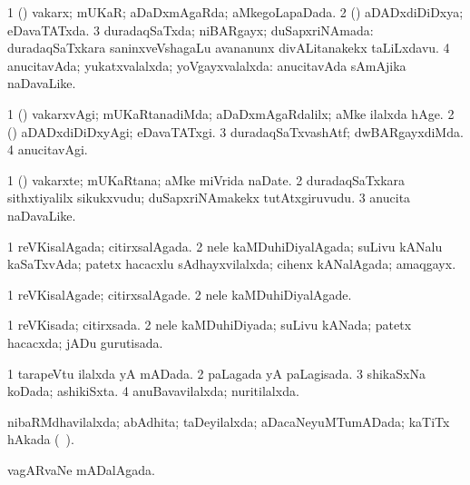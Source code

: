 \bentry
{} 
\gl{\gu}
\expl{}
\bmng
\bnum
\num{1} (\pArxparx) vakarx; mUKaR; aDaDxmAgaRda; aMkegoLapaDada. 
\num{2} (\gaparx) aDADxdiDiDxya; eDavaTATxda. 
\num{3} duradaqSaTxda; niBARgayx; duSapxriNAmada:  duradaqSaTxkara saninxveVshagaLu avananunx divALitanakekx taLiLxdavu. 
\num{4} anucitavAda; yukatxvalalxda; yoVgayxvalalxda:  anucitavAda sAmAjika naDavaLike. 
\enum
\emng
\eentry

\bentry
{} 
\gl{\kirxvi}
\expl{}
\bmng
\bnum
\num{1} (\pArxparx) vakarxvAgi; mUKaRtanadiMda; aDaDxmAgaRdalilx; aMke ilalxda hAge. 
\num{2} (\gaparx) aDADxdiDiDxyAgi; eDavaTATxgi. 
\num{3} duradaqSaTxvashAtf; dwBARgayxdiMda. 
\num{4} anucitavAgi. 
\enum
\emng
\eentry

\bentry
{} 
\gl{\nA}
\expl{}
\bmng
\bnum
\num{1} (\pArxparx) vakarxte; mUKaRtana; aMke miVrida naDate. 
\num{2} duradaqSaTxkara sithxtiyalilx sikukxvudu; duSapxriNAmakekx tutAtxgiruvudu. 
\num{3} anucita naDavaLike. 
\enum
\emng
\eentry

\bentry
{} 
\gl{\gu}
\expl{}
\bmng
\bnum
\num{1} reVKisalAgada; citirxsalAgada. 
\num{2} nele kaMDuhiDiyalAgada; suLivu kANalu kaSaTxvAda; patetx hacacxlu sAdhayxvilalxda; cihenx kANalAgada; amaqgayx. 
\enum
\emng
\eentry

\bentry
{} 
\gl{\kirxvi}
\expl{}
\bmng
\bnum
\num{1} reVKisalAgade; citirxsalAgade. 
\num{2} nele kaMDuhiDiyalAgade. 
\enum
\emng
\eentry

\bentry
{} 
\gl{\gu}
\expl{}
\bmng
\bnum
\num{1} reVKisada; citirxsada. 
\num{2} nele kaMDuhiDiyada; suLivu kANada; patetx hacacxda; jADu gurutisada. 
\enum
\emng
\eentry

\bentry
{} 
\gl{\gu}
\expl{}
\bmng
\bnum
\num{1} tarapeVtu ilalxda yA mADada. 
\num{2} paLagada yA paLagisada. 
\num{3} shikaSxNa koDada; ashikiSxta. 
\num{4} anuBavavilalxda; nuritilalxda. 
\enum
\emng
\eentry

\bentry
{} 
\gl{\gu}
\expl{}
\bmng
nibaRMdhavilalxda; abAdhita; taDeyilalxda; aDacaNeyuMTumADada; kaTiTx hAkada (\sA\ \rUpa). 
\emng
\eentry

\bentry
{} 
\gl{\gu}
\expl{}
\bmng
vagARvaNe mADalAgada. 
\emng
\eentry

